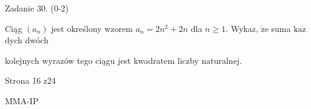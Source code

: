 \documentclass[a4paper,12pt]{article}
\begin{document}
Zadanie 30. (0-2)

Ciąg $(a_{n})$ jest określony wzorem $a_{n}=2n^{2}+2n$ dla $n\geq 1$. Wykaz, $\dot{\mathrm{z}}\mathrm{e}$ suma $\mathrm{k}\mathrm{a}\dot{\mathrm{z}}$ dych dwóch

kolejnych wyrazów tego ciągu jest kwadratem liczby naturalnej.

Strona 16 z24

MMA-IP
\end{document}

